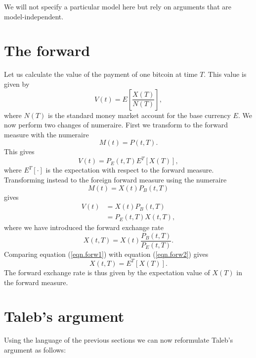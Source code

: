\documentclass[12pt, oneside]{article}
\begin{document}
We will not specify a particular model here but rely on arguments that are model-independent. 

\section{The forward}
Let us calculate the value of the payment of one bitcoin at time $T$. This value is given by
\begin{equation}
	V(t) = E\left[\frac{X(T)}{N(T)}\right],
\end{equation}
where $N(T)$ is the standard money market account for the base currency $E$. We now perform two changes of numeraire. First we transform to the forward measure with the numeraire
\begin{equation}
	M(t) = P(t,T).
\end{equation}
This gives
\begin{equation}\label{eqn.forw1}
	V(t) = P_E(t,T) E^T[ X(T) ],
\end{equation}
where $E^T[\cdot]$ is the expectation with respect to the forward measure. Transforming instead to the foreign forward measure using the numeraire 
\begin{equation}
	M(t) = X(t) P_B(t,T)
\end{equation}
gives
\begin{align}
	V(t) & = X(t) P_B(t,T) \\
	& = P_E(t,T) X(t,T)\label{eqn.forw2},
\end{align}
where we have introduced the forward exchange rate
\begin{equation}\label{eqn.defforward}
	X(t,T) = X(t) \frac{P_B(t,T)}{P_E(t,T)}.
\end{equation}
Comparing equation (\ref{eqn.forw1}) with equation (\ref{eqn.forw2}) gives
\begin{equation}\label{eqn.forwexp}
	X(t,T) = E^T[ X(T) ].
\end{equation}
The forward exchange rate is thus given by the expectation value of $X(T)$ in the forward measure.

\section{Taleb's argument}
Using the language of the previous sections we can now reformulate Taleb's argument as follows:
\end{document}
